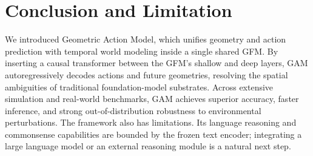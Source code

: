 \documentclass{article}
\begin{document}
\section{Conclusion and Limitation}
\label{sec:conclusion}
We introduced Geometric Action Model, which unifies geometry and action prediction with temporal world modeling inside a single shared GFM. By inserting a causal transformer between the GFM's shallow and deep layers, GAM autoregressively decodes actions and future geometries, resolving the spatial ambiguities of traditional foundation-model substrates. Across extensive simulation and real-world benchmarks, GAM achieves superior accuracy, faster inference, and strong out-of-distribution robustness to environmental perturbations.
The framework also has limitations. Its language reasoning and commonsense capabilities are bounded by the frozen text encoder; integrating a large language model or an external reasoning module is a natural next step.






\end{document}
